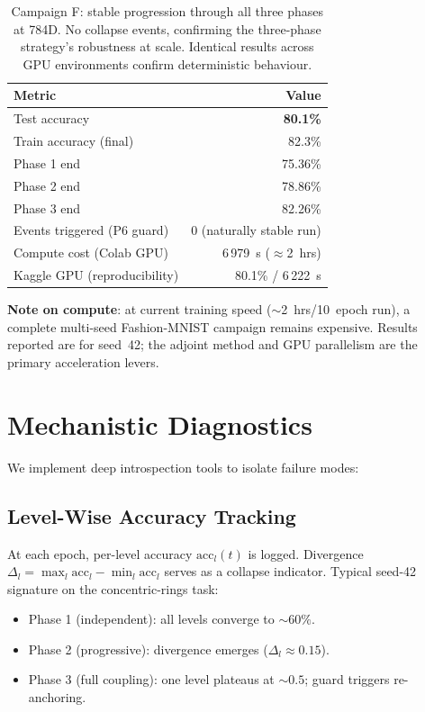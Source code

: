 \documentclass[11pt,a4paper]{article}
\begin{document}
\begin{table}[h]
\centering
\begin{tabular}{lr}
\toprule
\textbf{Metric} & \textbf{Value} \\
\midrule
Test accuracy               & \textbf{80.1\%} \\
Train accuracy (final)      & 82.3\% \\
Phase 1 end                 & 75.36\% \\
Phase 2 end                 & 78.86\% \\
Phase 3 end                 & 82.26\% \\
Events triggered (P6 guard) & 0 (naturally stable run) \\
Compute cost (Colab GPU)    & 6\,979~s ($\approx$2~hrs) \\
Kaggle GPU (reproducibility) & 80.1\% / 6\,222~s \\
\bottomrule
\end{tabular}
\caption{Campaign F: stable progression through all three phases at 784D.  No collapse events,
confirming the three-phase strategy's robustness at scale.  Identical results across GPU
environments confirm deterministic behaviour.}
\label{tab:campaign_f}
\end{table}

\textbf{Note on compute}: at current training speed ($\sim$2~hrs/10~epoch run), a complete
multi-seed Fashion-MNIST campaign remains expensive.  Results reported are for seed~42; the
adjoint method and GPU parallelism are the primary acceleration levers.

\section{Mechanistic Diagnostics}

We implement deep introspection tools to isolate failure modes:

\subsection{Level-Wise Accuracy Tracking}

At each epoch, per-level accuracy $\mathrm{acc}_l(t)$ is logged.  Divergence
$\Delta_l = \max_l \mathrm{acc}_l - \min_l \mathrm{acc}_l$ serves as a collapse indicator.
Typical seed-42 signature on the concentric-rings task:
\begin{itemize}
  \item Phase 1 (independent): all levels converge to $\sim 60\%$.
  \item Phase 2 (progressive): divergence emerges ($\Delta_l \approx 0.15$).
  \item Phase 3 (full coupling): one level plateaus at $\sim 0.5$; guard triggers re-anchoring.
\end{itemize}
\end{document}
